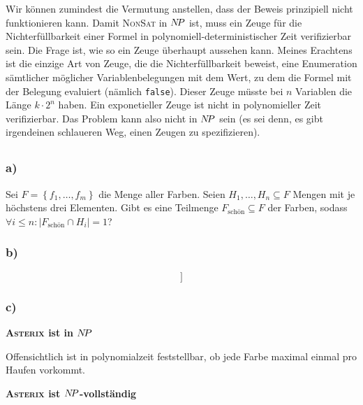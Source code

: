 \documentclass{article}
\begin{document}
Wir können zumindest die Vermutung anstellen, dass der Beweis prinzipiell nicht
funktionieren kann. Damit \textsc{NonSat} in $N\kern-2ptP$ ist, muss ein Zeuge für die
Nichterfüllbarkeit einer Formel in polynomiell-deterministischer Zeit
verifizierbar sein. Die Frage ist, wie so ein Zeuge überhaupt aussehen kann.
Meines Erachtens ist die einzige Art von Zeuge, die die Nichterfüllbarkeit
beweist, eine Enumeration sämtlicher möglicher Variablenbelegungen mit dem Wert,
zu dem die Formel mit der Belegung evaluiert (nämlich \texttt{false}). Dieser Zeuge müsste bei $n$
Variablen die Länge $k\cdot2^n$ haben. Ein exponetieller Zeuge ist nicht in
polynomieller Zeit verifizierbar. Das Problem kann also nicht in $N\kern-2ptP$ sein (es
sei denn, es gibt irgendeinen schlaueren Weg, einen Zeugen zu spezifizieren).

\subsection{} 

\subsubsection{a)}

Sei $F = \left\{f_1, \dots, f_m\right\}$ die Menge aller Farben. Seien $H_1,
\dots, H_n \subseteq F$ Mengen mit je höchstens drei Elementen. Gibt es eine
Teilmenge $F_{\text{schön}}\subseteq F$ der Farben, sodass $\forall i \le n:
|F_{\text{schön}} \cap H_i| = 1$?

\subsubsection{b)}

\begin{equation*}
   [[x_i \vee x_j \vee x_k]]
\end{equation*}

\subsubsection{c)}

\textbf{\textsc{Asterix} ist in $N\kern-2ptP$}
\vspace{\baselineskip}

Offensichtlich ist in polynomialzeit feststellbar, ob jede Farbe maximal einmal
pro Haufen vorkommt.

\vspace{\baselineskip}
\noindent\textbf{\textsc{Asterix} ist $N\kern-2ptP$-vollständig}
\vspace{\baselineskip}
\end{document}
